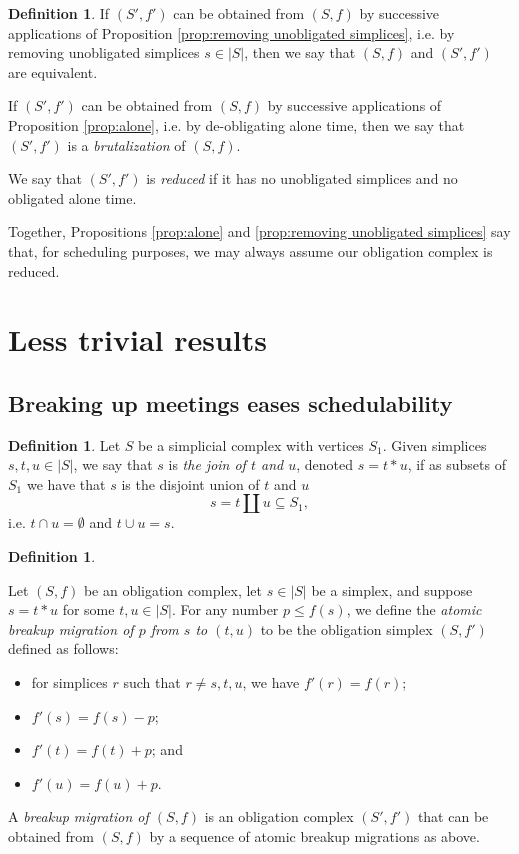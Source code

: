 \documentclass{amsart}
\def\ss{\subseteq}
\theoremstyle{remark}
\theoremstyle{definition}
\newtheorem{definition}[theorem]{Definition}
\begin{document}
\begin{definition}

If $(S',f')$ can be obtained from $(S,f)$ by successive applications of Proposition \ref{prop:removing unobligated simplices}, i.e. by removing unobligated simplices $s\in|S|$, then we say that $(S,f)$ and $(S',f')$ are equivalent.

If $(S',f')$ can be obtained from $(S,f)$ by successive applications of Proposition \ref{prop:alone}, i.e. by de-obligating alone time, then we say that $(S',f')$ is a {\em brutalization} of $(S,f)$.

We say that $(S',f')$ is {\em reduced} if it has no unobligated simplices and no obligated alone time. 

\end{definition}

Together, Propositions \ref{prop:alone} and \ref{prop:removing unobligated simplices} say that, for scheduling purposes, we may always assume our obligation complex is reduced.

\section{Less trivial results}

\subsection{Breaking up meetings eases schedulability}

\begin{definition}

Let $S$ be a simplicial complex with vertices $S_1$. Given simplices $s,t,u\in|S|$, we say that $s$ is {\em the join of $t$ and $u$}, denoted $s=t\ast u$, if as subsets of $S_1$ we have that $s$ is the disjoint union of $t$ and $u$ $$s=t\amalg u\ss S_1,$$ i.e. $t\cap u=\emptyset$ and $t\cup u=s$.

\end{definition}

\begin{definition}\label{def:migration}

Let $(S,f)$ be an obligation complex, let $s\in |S|$ be a simplex, and suppose $s=t\ast u$ for some $t,u\in |S|$. For any number $p\leq f(s)$, we define the {\em atomic breakup migration of $p$ from $s$ to $(t,u)$} to be the obligation simplex $(S,f')$ defined as follows: \begin{itemize}\item for simplices $r$ such that $r\neq s,t,u$, we have $f'(r)=f(r)$;\item $f'(s)=f(s)-p$; \item $f'(t)=f(t)+p$; and \item $f'(u)=f(u)+p$.\end{itemize}

A {\em breakup migration of $(S,f)$} is an obligation complex $(S',f')$ that can be obtained from $(S,f)$ by a sequence of atomic breakup migrations as above.

\end{definition}
\end{document}

